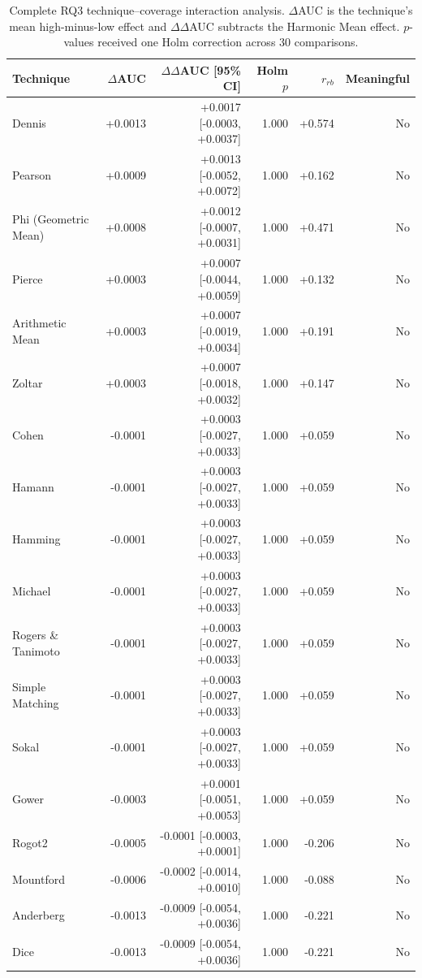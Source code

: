\begin{table}[t]
\centering
\caption{Complete RQ3 technique--coverage interaction analysis. $\Delta$AUC is the technique's mean high-minus-low effect and $\Delta\Delta$AUC subtracts the Harmonic Mean effect. $p$-values received one Holm correction across 30 comparisons.}
\label{tab:rq3-supplementary-interactions}
{\scriptsize
\setlength{\tabcolsep}{4pt}
\begin{tabular}{lrrrrr}
\toprule
Technique & $\Delta$AUC & $\Delta\Delta$AUC [95\% CI] & Holm $p$ & $r_{rb}$ & Meaningful \\
\midrule
Dennis & +0.0013 & +0.0017 [-0.0003, +0.0037] & 1.000 & +0.574 & No \\
Pearson & +0.0009 & +0.0013 [-0.0052, +0.0072] & 1.000 & +0.162 & No \\
Phi (Geometric Mean) & +0.0008 & +0.0012 [-0.0007, +0.0031] & 1.000 & +0.471 & No \\
Pierce & +0.0003 & +0.0007 [-0.0044, +0.0059] & 1.000 & +0.132 & No \\
Arithmetic Mean & +0.0003 & +0.0007 [-0.0019, +0.0034] & 1.000 & +0.191 & No \\
Zoltar & +0.0003 & +0.0007 [-0.0018, +0.0032] & 1.000 & +0.147 & No \\
Cohen & -0.0001 & +0.0003 [-0.0027, +0.0033] & 1.000 & +0.059 & No \\
Hamann & -0.0001 & +0.0003 [-0.0027, +0.0033] & 1.000 & +0.059 & No \\
Hamming & -0.0001 & +0.0003 [-0.0027, +0.0033] & 1.000 & +0.059 & No \\
Michael & -0.0001 & +0.0003 [-0.0027, +0.0033] & 1.000 & +0.059 & No \\
Rogers \& Tanimoto & -0.0001 & +0.0003 [-0.0027, +0.0033] & 1.000 & +0.059 & No \\
Simple Matching & -0.0001 & +0.0003 [-0.0027, +0.0033] & 1.000 & +0.059 & No \\
Sokal & -0.0001 & +0.0003 [-0.0027, +0.0033] & 1.000 & +0.059 & No \\
Gower & -0.0003 & +0.0001 [-0.0051, +0.0053] & 1.000 & +0.059 & No \\
Rogot2 & -0.0005 & -0.0001 [-0.0003, +0.0001] & 1.000 & -0.206 & No \\
Mountford & -0.0006 & -0.0002 [-0.0014, +0.0010] & 1.000 & -0.088 & No \\
Anderberg & -0.0013 & -0.0009 [-0.0054, +0.0036] & 1.000 & -0.221 & No \\
Dice & -0.0013 & -0.0009 [-0.0054, +0.0036] & 1.000 & -0.221 & No \\

\end{tabular}}
\end{table}
